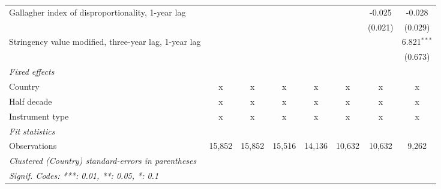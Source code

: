 \begin{table}[htbp]
\begin{tabular}{lccccccc}
      Gallagher index of disproportionality, 1-year lag     &         &         &              &         &               & -0.025        & -0.028\\   
                                                            &         &         &              &         &               & (0.021)       & (0.029)\\   
      Stringency value modified, three-year lag, 1-year lag &         &         &              &         &               &               & 6.821$^{***}$\\   
                                                            &         &         &              &         &               &               & (0.673)\\   
      \emph{Fixed effects}\\
      Country                                               & x       & x       & x            & x       & x             & x             & x\\  
      Half decade                                           & x       & x       & x            & x       & x             & x             & x\\  
      Instrument type                                       & x       & x       & x            & x       & x             & x             & x\\  
      \midrule \emph{Fit statistics}\\
      Observations                                          & 15,852  & 15,852  & 15,516       & 14,136  & 10,632        & 10,632        & 9,262\\  
      \midrule
      \multicolumn{8}{l}{\emph{Clustered (Country) standard-errors in parentheses}}\\
      \multicolumn{8}{l}{\emph{Signif. Codes: ***: 0.01, **: 0.05, *: 0.1}}\\
   \end{tabular}
\end{table}


